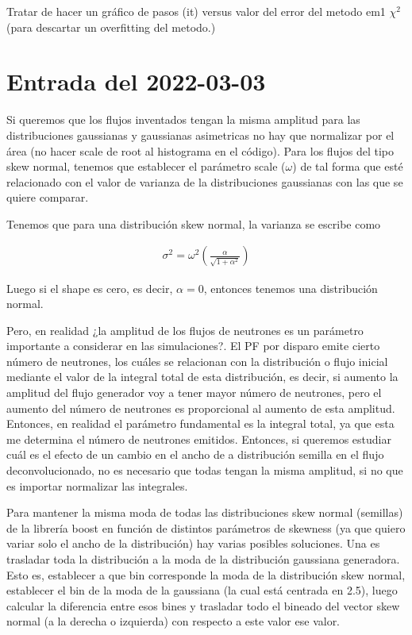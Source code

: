 \documentclass[11pt,letterpaper]{article}
\begin{document}
Tratar de hacer un gráfico de pasos (it) versus valor del error del metodo em1 $\chi^2$ (para descartar un overfitting del metodo.)

\section{Entrada del 2022-03-03}\label{2022-03-03}

Si queremos que los flujos inventados tengan la misma amplitud para las distribuciones gaussianas y gaussianas asimetricas no hay que normalizar por el área (no hacer scale de root al histograma en el código). Para los flujos del tipo skew normal, tenemos que establecer el parámetro scale ($\omega$) de tal forma que esté relacionado con el valor de varianza de la distribuciones gaussianas con las que se quiere comparar.

Tenemos que para una distribución skew normal, la varianza se escribe como 

\begin{align}
\sigma^2 = \omega^2 \left(\frac{\alpha}{\sqrt{1+\alpha^2}} \right)
\end{align}

Luego si el shape es cero, es decir, $\alpha =0$, entonces tenemos una distribución normal.

Pero, en realidad ¿la amplitud de los flujos de neutrones es un parámetro importante a considerar en las simulaciones?. El PF por disparo emite cierto número de neutrones, los cuáles se relacionan con la distribución o flujo inicial mediante el valor de la integral total de esta distribución, es decir, si aumento la amplitud del flujo generador voy a tener mayor número de neutrones, pero el aumento del número de neutrones es proporcional al aumento de esta amplitud. Entonces, en realidad el parámetro fundamental es la integral total, ya que esta me determina el número de neutrones emitidos. Entonces, si queremos estudiar cuál es el efecto de un cambio en el ancho de a distribución semilla en el flujo deconvolucionado, no es necesario que todas tengan la misma amplitud, si no que es importar normalizar las integrales.

Para mantener la misma moda de todas las distribuciones skew normal (semillas) de la librería boost en función de distintos parámetros de skewness (ya que quiero variar solo el ancho de la distribución) hay varias posibles soluciones. Una es trasladar toda la distribución a la moda de la distribución gaussiana generadora. Esto es, establecer a que bin corresponde la moda de la distribución skew normal, establecer el bin de la moda de la gaussiana (la cual está centrada en 2.5), luego calcular la diferencia entre esos bines y trasladar todo el bineado del vector skew normal (a la derecha o izquierda) con respecto a este valor ese valor.
\end{document}
